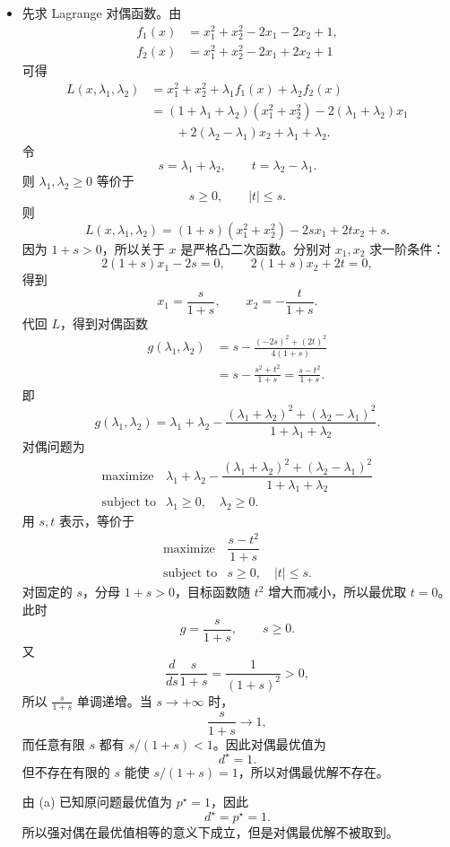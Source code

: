 \documentclass[12pt,a4paper]{article}
\begin{document}
\begin{itemize}
  \item[(c)] 先求 Lagrange 对偶函数。由
  \[
  \begin{aligned}
    f_1(x)&=x_1^2+x_2^2-2x_1-2x_2+1,\\
    f_2(x)&=x_1^2+x_2^2-2x_1+2x_2+1
  \end{aligned}
  \]
  可得
  \[
  \begin{aligned}
    L(x,\lambda_1,\lambda_2)
    &=x_1^2+x_2^2+\lambda_1 f_1(x)+\lambda_2 f_2(x)\\
    &=(1+\lambda_1+\lambda_2)(x_1^2+x_2^2)
      -2(\lambda_1+\lambda_2)x_1\\
    &\qquad +2(\lambda_2-\lambda_1)x_2+\lambda_1+\lambda_2.
  \end{aligned}
  \]
  令
  \[
    s=\lambda_1+\lambda_2,\qquad t=\lambda_2-\lambda_1.
  \]
  则 $\lambda_1,\lambda_2\geq0$ 等价于
  \[
    s\geq0,\qquad |t|\leq s.
  \]
  则
  \[
    L(x,\lambda_1,\lambda_2)
    =(1+s)(x_1^2+x_2^2)-2s x_1+2t x_2+s.
  \]
  因为 $1+s>0$，所以关于 $x$ 是严格凸二次函数。分别对 $x_1,x_2$ 求一阶条件：
  \[
    2(1+s)x_1-2s=0,\qquad
    2(1+s)x_2+2t=0,
  \]
  得到
  \[
    x_1=\frac{s}{1+s},\qquad
    x_2=-\frac{t}{1+s}.
  \]
  代回 $L$，得到对偶函数
  \[
  \begin{aligned}
    g(\lambda_1,\lambda_2)
    &=s-\frac{(-2s)^2+(2t)^2}{4(1+s)}\\
    &=s-\frac{s^2+t^2}{1+s}
    =\frac{s-t^2}{1+s}.
  \end{aligned}
  \]
  即
  \[
    g(\lambda_1,\lambda_2)
    =
    \lambda_1+\lambda_2
    -\frac{(\lambda_1+\lambda_2)^2+(\lambda_2-\lambda_1)^2}
    {1+\lambda_1+\lambda_2}.
  \]
  对偶问题为
  \[
    \boxed{
    \begin{array}{ll}
      \text{maximize} &
      \lambda_1+\lambda_2
      -\dfrac{(\lambda_1+\lambda_2)^2+(\lambda_2-\lambda_1)^2}
      {1+\lambda_1+\lambda_2}\\[0.8em]
      \text{subject to} & \lambda_1\geq0,\quad \lambda_2\geq0.
    \end{array}}
  \]
  用 $s,t$ 表示，等价于
  \[
    \begin{array}{ll}
      \text{maximize} & \dfrac{s-t^2}{1+s}\\[0.6em]
      \text{subject to} & s\geq0,\quad |t|\leq s.
    \end{array}
  \]
  对固定的 $s$，分母 $1+s>0$，目标函数随 $t^2$ 增大而减小，所以最优取 $t=0$。此时
  \[
    g=\frac{s}{1+s},\qquad s\geq0.
  \]
  又
  \[
    \frac{d}{ds}\frac{s}{1+s}=\frac{1}{(1+s)^2}>0,
  \]
  所以 $\frac{s}{1+s}$ 单调递增。当 $s\to+\infty$ 时，
  \[
    \frac{s}{1+s}\to1,
  \]
  而任意有限 $s$ 都有 $s/(1+s)<1$。因此对偶最优值为
  \[
    \boxed{d^\star=1.}
  \]
  但不存在有限的 $s$ 能使 $s/(1+s)=1$，所以对偶最优解不存在。

  由 (a) 已知原问题最优值为 $p^\star=1$，因此
  \[
    \boxed{d^\star=p^\star=1.}
  \]
  所以强对偶在最优值相等的意义下成立，但是对偶最优解不被取到。
\end{itemize}
\end{document}
